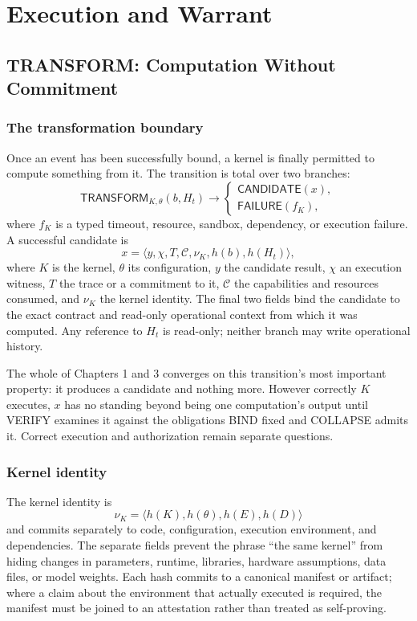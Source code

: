 \documentclass[11pt,openany]{book}
\newcommand{\Transform}{\mathsf{TRANSFORM}}
\begin{document}
\part{Execution and Warrant}

\chapter{TRANSFORM: Computation Without Commitment}
\section{The transformation boundary}

Once an event has been successfully bound, a kernel is finally permitted to
compute something from it. The transition is total over two branches:
\[
 \Transform_{K,\theta}(b,H_t)\longrightarrow
 \begin{cases}
   \mathsf{CANDIDATE}(x),\\
   \mathsf{FAILURE}(f_K),
 \end{cases}
\]
where \(f_K\) is a typed timeout, resource, sandbox, dependency, or execution
failure. A successful candidate is
\[
 x=\langle y,\chi,T,\mathcal C,\nu_K,h(b),h(H_t)\rangle,
\]
where \(K\) is the kernel, \(\theta\) its configuration, \(y\) the candidate
result, \(\chi\) an execution witness, \(T\) the trace or a commitment to it,
\(\mathcal C\) the capabilities and resources consumed, and \(\nu_K\) the
kernel identity. The final two fields bind the candidate to the exact contract
and read-only operational context from which it was computed. Any reference to
\(H_t\) is read-only; neither branch may write operational history.

The whole of Chapters 1 and 3 converges on this transition's most important
property: it produces a candidate and nothing more. However correctly \(K\)
executes, \(x\) has no standing beyond being one computation's output until
VERIFY examines it against the obligations BIND fixed and COLLAPSE admits it.
Correct execution and authorization remain separate questions.

\section{Kernel identity}

The kernel identity is
\[
 \nu_K=\langle h(K),h(\theta),h(E),h(D)\rangle
\]
and commits separately to code, configuration, execution environment, and
dependencies. The separate fields prevent the phrase ``the same kernel'' from
hiding changes in parameters, runtime, libraries, hardware assumptions, data
files, or model weights. Each hash commits to a canonical manifest or artifact;
where a claim about the environment that actually executed is required, the
manifest must be joined to an attestation rather than treated as self-proving.
\end{document}
